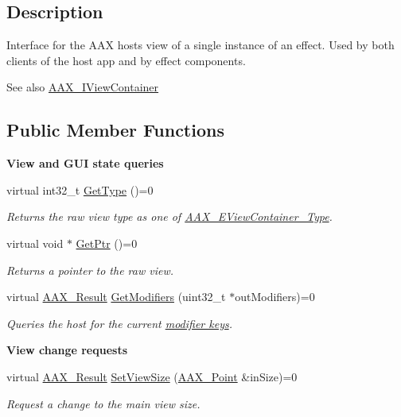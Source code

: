 \subsection{Description}
Interface for the A\+A\+X host\textquotesingle{}s view of a single instance of an effect. Used by both clients of the host app and by effect components. 

\begin{DoxySeeAlso}{See also}
\hyperlink{a00117}{A\+A\+X\+\_\+\+I\+View\+Container} 
\end{DoxySeeAlso}
\subsection*{Public Member Functions}
\begin{Indent}{\bf View and G\+U\+I state queries}\par
\begin{DoxyCompactItemize}
\item 
virtual int32\+\_\+t \hyperlink{a00084_ac3741d648a766bab6ab292214db42f76}{Get\+Type} ()=0
\begin{DoxyCompactList}\small\item\em Returns the raw view type as one of \hyperlink{a00214_ab4c36de253fc80b541eb51074c64caef}{A\+A\+X\+\_\+\+E\+View\+Container\+\_\+\+Type}. \end{DoxyCompactList}\item 
virtual void $\ast$ \hyperlink{a00084_a180a3f3407999231d78d437243c70506}{Get\+Ptr} ()=0
\begin{DoxyCompactList}\small\item\em Returns a pointer to the raw view. \end{DoxyCompactList}\item 
virtual \hyperlink{a00149_a4d8f69a697df7f70c3a8e9b8ee130d2f}{A\+A\+X\+\_\+\+Result} \hyperlink{a00084_a2dcb6da5a296c9b5d9f67c40880606f1}{Get\+Modifiers} (uint32\+\_\+t $\ast$out\+Modifiers)=0
\begin{DoxyCompactList}\small\item\em Queries the host for the current \hyperlink{a00206_a47756e0a56d00468b7045eb26500cb78}{modifier keys}. \end{DoxyCompactList}\end{DoxyCompactItemize}
\end{Indent}
\begin{Indent}{\bf View change requests}\par
\begin{DoxyCompactItemize}
\item 
virtual \hyperlink{a00149_a4d8f69a697df7f70c3a8e9b8ee130d2f}{A\+A\+X\+\_\+\+Result} \hyperlink{a00084_a51e307abdc817dc20582e87d5b0b32e3}{Set\+View\+Size} (\hyperlink{a00119}{A\+A\+X\+\_\+\+Point} \&in\+Size)=0
\begin{DoxyCompactList}\small\item\em Request a change to the main view size. \end{DoxyCompactList}\end{DoxyCompactItemize}
\end{Indent}

